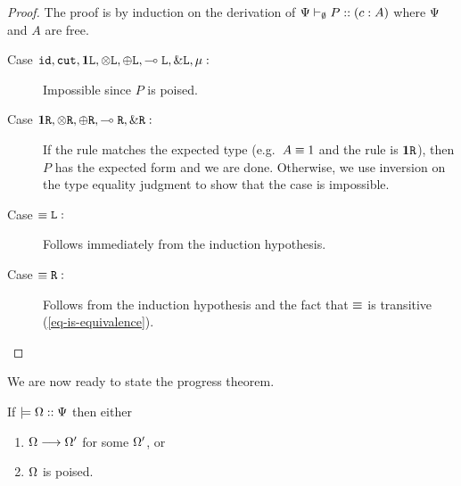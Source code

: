 \begin{proof}
  The proof is by induction on the derivation of ${\Psi} \vdash_{\emptyset} P :: (c : A)$ where $\Psi$ and $A$ are free.

  \begin{description}
    \item[Case $\texttt{id}, \texttt{cut}, \mathbf{1}\texttt{L}, \otimes\texttt{L}, \oplus\texttt{L}, \multimap\texttt{L}, \&\texttt{L}, \mu :$] Impossible since $P$ is poised.

    \item[Case $\mathbf{1}\texttt{R}, \otimes\texttt{R}, \oplus\texttt{R}, \multimap\texttt{R}, \&\texttt{R} :$] If the rule matches the expected type (e.g.\ $A \equiv 1$ and the rule is $\mathbf{1}\texttt{R}$), then $P$ has the expected form and we are done. Otherwise, we use inversion on the type equality judgment to show that the case is impossible.

    \item[Case $\equiv\texttt{L} :$] Follows immediately from the induction hypothesis.

    \item[Case $\equiv\texttt{R} :$] Follows from the induction hypothesis and the fact that $\equiv$ is transitive (\cref{eq-is-equivalence}).
  \end{description}
\end{proof}

We are now ready to state the progress theorem.

\begin{theorem}[Progress]
\label{base:progress}
If $\models {\Omega} :: {\Psi}$ then either
\begin{enumerate}
  \item $\Omega \longrightarrow \Omega'$ for some $\Omega'$, or
  \item $\Omega$ is poised.
\end{enumerate}
\end{theorem}

